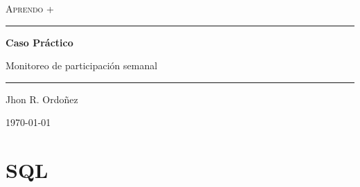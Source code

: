 \documentclass[12pt,a4paper]{article}
\newcommand{\tituloinforme}{Caso Práctico}
\newcommand{\subtituloinforme}{Monitoreo de participación semanal}
\newcommand{\autorinforme}{Jhon R. Ordoñez}
\newcommand{\institucion}{Aprendo +}
\newcommand{\fechainforme}{\today}
\begin{document}
	
	\begin{titlepage}
		\centering
		\vspace*{2cm}
		{\huge\scshape \institucion\par}
		\vspace{3cm}
		\rule{\textwidth}{1.2pt}\par\vspace{0.6cm}
		{\Huge\bfseries \tituloinforme\par}
		\vspace{0.4cm}
		{\Large \subtituloinforme\par}
		\vspace{0.6cm}
		\rule{\textwidth}{1.2pt}\par
		\vspace{0.6cm}
			\begin{abstract}
				\noindent La participación de las familias se mantiene en torno al 33\% en la semana 6, pero ese
				promedio esconde un problema concentrado en tres instituciones rurales de UGEL C (IE-C05,
				IE-C06 e IE-C07), donde la participación cayó de aproximadamente 37\% a 7\%.
			 	Estas instituciones
				incluyen los cinco grupos con mayor caída y 40 de las 142 familias que dejaron de participar,
				por lo que es ahí donde conviene actuar primero. Además, la baja de UGEL B en la semana 3 (21.8\%)
				no refleja un desinterés de las familias, sino la ausencia de registros los días 2 y 3 de
				septiembre, por lo que esa cifra no es comparable y debe leerse como dato incompleto.
			\end{abstract}
		\vfill
		{\Large \autorinforme\par}
		\vspace{0.5cm}
		{\large \fechainforme\par}
		\vspace{1cm}
	\end{titlepage}
	
	
	
	\section{SQL}
		

\end{document}
